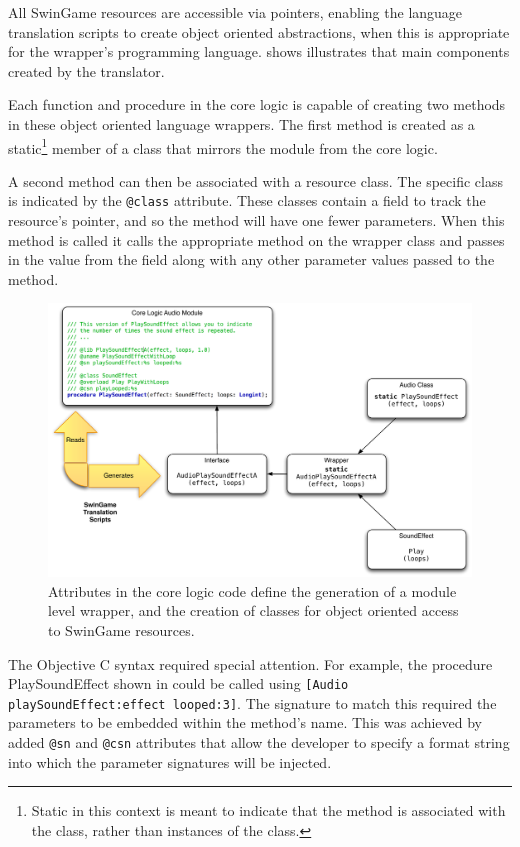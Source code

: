 All SwinGame resources are accessible via pointers, enabling the language translation scripts to create object oriented abstractions, when this is appropriate for the wrapper's programming language.  shows illustrates that main components created by the translator. 

Each function and procedure in the core logic is capable of creating two methods in these object oriented language wrappers. The first method is created as a static\footnote{Static in this context is meant to indicate that the method is associated with the class, rather than instances of the class.} member of a class that mirrors the module from the core logic. 

A second method can then be associated with a resource class. The specific class is indicated by the \texttt{@class} attribute. These classes contain a field to track the resource's pointer, and so the method will have one fewer parameters. When this method is called it calls the appropriate method on the wrapper class and passes in the value from the field along with any other parameter values passed to the method.

\begin{figure}[thbp]
  \centering
  \includegraphics[width=\textwidth]{SwinGameWrapperOutput}
  \caption{Attributes in the core logic code define the generation of a module level wrapper, and the creation of classes for object oriented access to SwinGame resources.}
  \label{fig:swingame_wrapper_output}
\end{figure}

The Objective C syntax required special attention. For example, the procedure PlaySoundEffect shown in  could be called using \texttt{[Audio playSoundEffect:effect looped:3]}. The signature to match this required the parameters to be embedded within the method's name. This was achieved by added \texttt{@sn} and \texttt{@csn} attributes that allow the developer to specify a format string into which the parameter signatures will be injected.

